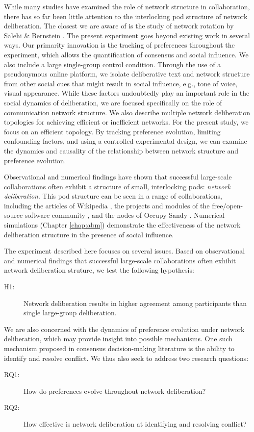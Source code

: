 While many studies have examined the role of network structure in collaboration, there has so far been little attention to the interlocking pod structure of network deliberation.
The closest we are aware of is the study of network rotation by Salehi \& Bernstein \cite{salehi_hive_2018}.
The present experiment goes beyond existing work in several ways.
Our primarity innovation is the tracking of preferences throughout the experiment,
which allows the quantification of consensus and social influence.
We also include a large single-group control condition.
Through the use of a pseudonymous online platform, we isolate deliberative text and network structure from other social cues that
might result in social influence, e.g., tone of voice, visual appearance.
While these factors undoubtedly play an important role in the social dynamics of deliberation,
we are focused specifically on the role of communication network structure.
We also describe multiple network deliberation topologies for achieving efficient or inefficient networks.
For the present study, we focus on an efficient topology.
By tracking preference evolution, limiting confounding factors, and using a controlled experimental design,
we can examine the dynamics and causality of the relationship between network structure and preference evolution.

Observational and numerical findings have shown that successful large-scale collaborations often exhibit a structure
of small, interlocking pods: {\em network deliberation}.
This pod structure can be seen in a range of collaborations, including the
articles of Wikipedia \cite{platt_network_2018},
the projects and modules of the free/open-source software community \cite{benkler_coases_2002},
and the nodes of Occupy Sandy \cite{brugh_combining_2019}.
Numerical simulations (Chapter \ref{chap:abm}) demonstrate the effectiveness of the network
deliberation structure in the presence of social influence.

The experiment described here focuses on several issues.
Based on observational and numerical findings that successful large-scale collaborations often exhibit network deliberation struture, we test the following hypothesis:
\begin{description}
\item[H1:] Network deliberation results in higher agreement among participants than single large-group deliberation.
\end{description}
We are also concerned with the dynamics of preference evolution under network deliberation, which may provide insight into possible mechanisms.
One such mechanism proposed in consensus decision-making literature is the ability to identify and resolve conflict.
We thus also seek to address two research questions:
\begin{description}
\item[RQ1:] How do preferences evolve throughout network deliberation?
\item[RQ2:] How effective is network deliberation at identifying and resolving conflict?
\end{description}

